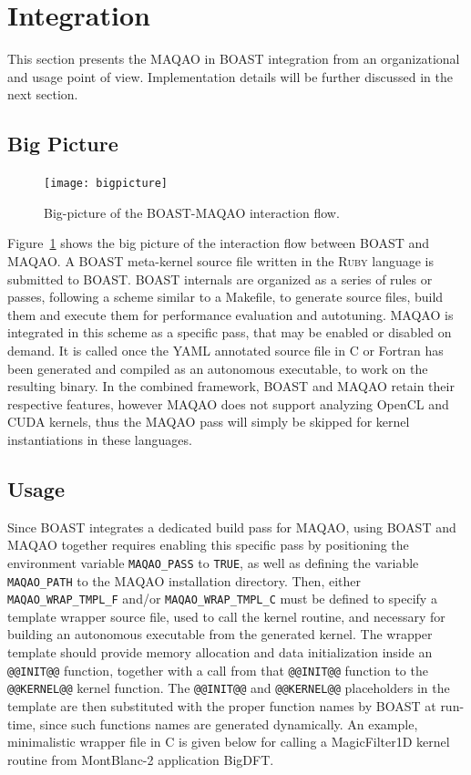 \documentclass[11pt, a4paper, twoside]{montblanc2}
\def\ruby{\textsc{Ruby}\xspace}
\begin{document}
\section{Integration}\label{sec:integration}

This section presents the MAQAO in BOAST integration from an organizational and usage point of view. 
Implementation details will be further discussed in the next section.

\subsection{Big Picture}
\begin{figure}[h]
  \centering
\texttt{[image: bigpicture]}
\caption{Big-picture of the BOAST-MAQAO interaction flow.}\label{fig:bigpict}
\end{figure}

Figure~\ref{fig:bigpict} shows the big picture of the interaction flow between BOAST and MAQAO. A 
BOAST meta-kernel source file written in the \ruby language is submitted to BOAST. BOAST internals 
are organized as a series of rules or passes, following a scheme similar to a Makefile, to generate 
source files, build them and execute them for performance evaluation and autotuning. MAQAO is 
integrated in this scheme as a specific pass, that may be enabled or disabled on demand. It is called 
once the YAML annotated source file in C or Fortran has been generated and compiled as an autonomous 
executable, to work on the resulting binary. In the combined framework, BOAST and MAQAO retain their 
respective features, however MAQAO does not support analyzing OpenCL and CUDA kernels, thus the 
MAQAO pass will simply be skipped for kernel instantiations in these languages.

\subsection{Usage}

Since BOAST integrates a dedicated build pass for MAQAO, using BOAST and MAQAO together requires 
enabling this specific pass by positioning the environment variable \verb|MAQAO_PASS| to \texttt{TRUE}, as 
well as defining the variable \verb|MAQAO_PATH| to the MAQAO installation directory. Then, either 
\verb|MAQAO_WRAP_TMPL_F| and/or \verb|MAQAO_WRAP_TMPL_C| must be defined to specify a template wrapper source file, used 
to call the kernel routine, and necessary for building an autonomous executable from the generated kernel. The wrapper 
template should provide memory allocation and data initialization inside an \verb|@@INIT@@| 
function, together with a call from that \verb|@@INIT@@| function to the \verb|@@KERNEL@@| kernel 
function. The \verb|@@INIT@@| and \verb|@@KERNEL@@| placeholders in the template are then 
substituted with the proper function names by BOAST at run-time, since such functions names are 
generated dynamically. An example, minimalistic wrapper file in C is given below for calling a 
MagicFilter1D kernel routine from MontBlanc-2 application BigDFT.
\end{document}
